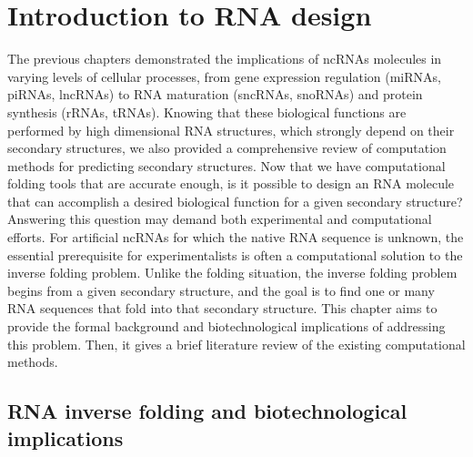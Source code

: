 \chapter{Introduction to RNA design}\label{ch:review_design} %
The previous chapters demonstrated the implications of \acp{ncRNA} molecules in varying levels of cellular processes, from gene expression regulation (\acp{miRNA}, \acp{piRNA}, \acp{lncRNA}) to \ac{RNA} maturation (\acp{sncRNA}, \acp{snoRNA}) and protein synthesis (\acp{rRNA}, \acp{tRNA}). Knowing that these biological functions are performed by high dimensional \ac{RNA} structures, which strongly depend on their secondary structures,  we also provided a comprehensive review of computation methods for predicting secondary structures. Now that we have computational folding tools that are accurate enough, is it possible to design an \ac{RNA} molecule that can accomplish a desired biological function for a given secondary structure? Answering this question may demand both experimental and computational efforts. For artificial \acp{ncRNA} for which the native \ac{RNA} sequence is unknown, the essential prerequisite for experimentalists is often a computational solution to the inverse folding problem. Unlike the folding situation, the inverse folding problem begins from a given secondary structure, and the goal is to find one or many  \ac{RNA} sequences that fold into that secondary structure. This chapter aims to provide the formal background and biotechnological implications of addressing this problem. Then, it gives a brief literature review of the existing computational methods. 

\section{RNA inverse folding and biotechnological implications}  

